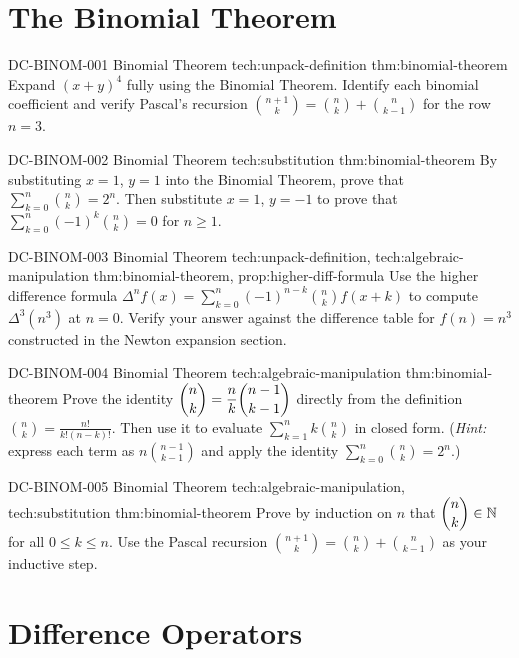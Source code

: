 \section*{The Binomial Theorem}

\exstubgenfull
  {DC-BINOM-001}
  {Binomial Theorem}
  {tech:unpack-definition}
  {thm:binomial-theorem}
  {Expand \((x+y)^4\) fully using the Binomial Theorem. Identify each
  binomial coefficient and verify Pascal's recursion
  \(\binom{n+1}{k} = \binom{n}{k} + \binom{n}{k-1}\) for the row \(n=3\).}

\exstubgenfull
  {DC-BINOM-002}
  {Binomial Theorem}
  {tech:substitution}
  {thm:binomial-theorem}
  {By substituting \(x = 1\), \(y = 1\) into the Binomial Theorem, prove
  that \(\displaystyle\sum_{k=0}^{n}\binom{n}{k} = 2^n\). Then substitute
  \(x = 1\), \(y = -1\) to prove that \(\displaystyle\sum_{k=0}^{n}(-1)^k\binom{n}{k} = 0\)
  for \(n \ge 1\).}

\exstubgenfull
  {DC-BINOM-003}
  {Binomial Theorem}
  {tech:unpack-definition, tech:algebraic-manipulation}
  {thm:binomial-theorem, prop:higher-diff-formula}
  {Use the higher difference formula
  \(\Delta^n f(x) = \displaystyle\sum_{k=0}^{n}(-1)^{n-k}\binom{n}{k}f(x+k)\)
  to compute \(\Delta^3(n^3)\) at \(n = 0\). Verify your answer against
  the difference table for \(f(n) = n^3\) constructed in the Newton
  expansion section.}

\exstubgenfull
  {DC-BINOM-004}
  {Binomial Theorem}
  {tech:algebraic-manipulation}
  {thm:binomial-theorem}
  {Prove the identity \(\dbinom{n}{k} = \dfrac{n}{k}\dbinom{n-1}{k-1}\)
  directly from the definition \(\binom{n}{k} = \frac{n!}{k!(n-k)!}\).
  Then use it to evaluate \(\displaystyle\sum_{k=1}^{n} k\binom{n}{k}\)
  in closed form. (\emph{Hint:} express each term as \(n\binom{n-1}{k-1}\)
  and apply the identity \(\sum_{k=0}^{n}\binom{n}{k} = 2^n\).)}

\exstubgenfull
  {DC-BINOM-005}
  {Binomial Theorem}
  {tech:algebraic-manipulation, tech:substitution}
  {thm:binomial-theorem}
  {Prove by induction on \(n\) that \(\dbinom{n}{k} \in \mathbb{N}\)
  for all \(0 \le k \le n\). Use the Pascal recursion
  \(\binom{n+1}{k} = \binom{n}{k} + \binom{n}{k-1}\) as your
  inductive step.}

\section*{Difference Operators}

